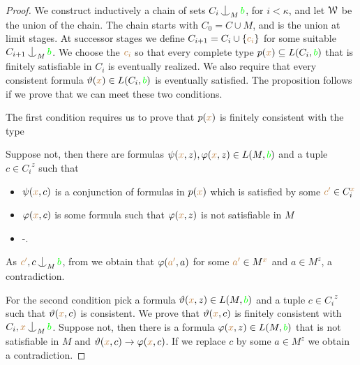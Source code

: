\begin{proof}
  We construct inductively a chain of sets $C_i\nonfork_M{\gr b}$, for $i<\kappa$, and let $\EuScript W$ be the union of the chain.
  The chain starts with $C_0=C\cup M$, and is the union at limit stages.
  At successor stages we define $C_{i+1}=C_i\cup\{{\color{brown} c_i}\}$ for some suitable $C_{i+1}\nonfork_{M}{\gr b}$.
  We choose the ${\color{brown} c_i}$ so  that every complete type $p({\color{brown} x})\subseteq L(C_i,{\color{green} b})$ that is finitely satisfiable in $C_i$ is eventually realized.
  We also require that every consistent formula $\vartheta({\color{brown} x})\in L(C_i,{\color{green} b})$ is eventually satisfied.
  The proposition follows if we prove that we can meet these two conditions.

  The first condition requires us to prove that $p({\color{brown} x})$ is finitely consistent with the type 
  

  Suppose not, then there are formulas $\psi({\color{brown} x},z), \varphi({\color{brown} x},z)\in L(M,{\color{green} b})$ and a tuple $c\in{C_i}^z$ such that 

  \begin{itemize}
    \item[1.] $\psi({\color{brown} x},c)$ is a conjunction of formulas in $p({\color{brown} x})$ which is satisfied by some ${\color{brown} c'}\in C_i^{{\color{brown} x}}$
  
    \item[2.]$\varphi({\color{brown} x}, c)$ is some formula such that $\varphi({\color{brown} x}, z)$ is not satisfiable in $M$

    \item[3.]\noindent\kern-\leftmargin{}.
  \end{itemize}

  As ${\mr c'},c\nonfork_{M}{\gr b}$, from  we obtain that $\varphi({\color{brown} a'},a)$ for some ${\color{brown} a'}\in M^{\color{brown} x}$ and $a\in M^z$, a contradiction.
  
  For the second condition pick a formula $\vartheta({\color{brown} x},z)\in L(M,{\color{green} b})$ and a tuple $c\in{C_i}^z$ such that $\vartheta({\color{brown} x},c)$ is consistent.
  We prove that $\vartheta({\color{brown} x},c)$ is finitely consistent with $C_i,{\mr x}\nonfork_{M}{\gr b}$.
  Suppose not, then there is a formula $\varphi({\color{brown} x}, z)\in L(M,{\color{green} b})$ that is not satisfiable in $M$ and $\vartheta({\color{brown} x},c)\rightarrow\varphi({\color{brown} x}, c)$. 
  If we replace $c$ by some $a\in M^z$ we obtain a contradiction.
\end{proof}

